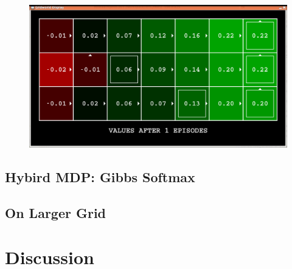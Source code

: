 \documentclass[11pt]{article}
\begin{document}
\begin{figure}[h!]
\centering
\includegraphics[width=\textwidth]{figure/hybird_6_4}
\end{figure}

\subsection{Hybird MDP: Gibbs Softmax}

\subsection{On Larger Grid}

\section{Discussion}
\end{document}
